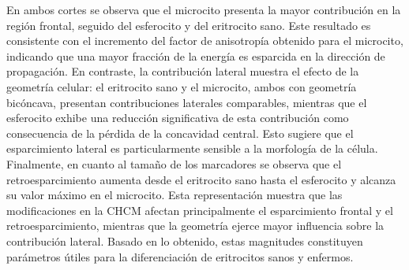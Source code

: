 En ambos cortes se observa que el microcito presenta la mayor contribución en la región frontal, seguido del esferocito y del eritrocito sano. Este resultado es consistente con el incremento del factor de anisotropía obtenido para el microcito, indicando que una mayor fracción de la energía es esparcida en la dirección de propagación. En contraste, la contribución lateral muestra el efecto de la geometría celular: el eritrocito sano y el microcito, ambos con geometría bicóncava, presentan contribuciones laterales comparables, mientras que el esferocito exhibe una reducción significativa de esta contribución como consecuencia de la pérdida de la concavidad central. Esto sugiere que el esparcimiento lateral es particularmente sensible a la morfología de la célula. Finalmente, en cuanto al tamaño de los marcadores se observa que el retroesparcimiento aumenta desde el eritrocito sano hasta el esferocito y alcanza su valor máximo en el microcito. Esta representación muestra que las modificaciones en la CHCM afectan principalmente el esparcimiento frontal y el retroesparcimiento, mientras que la geometría ejerce mayor influencia sobre la contribución lateral. Basado en lo obtenido, estas magnitudes constituyen parámetros útiles para la diferenciación de eritrocitos sanos y enfermos.
 
